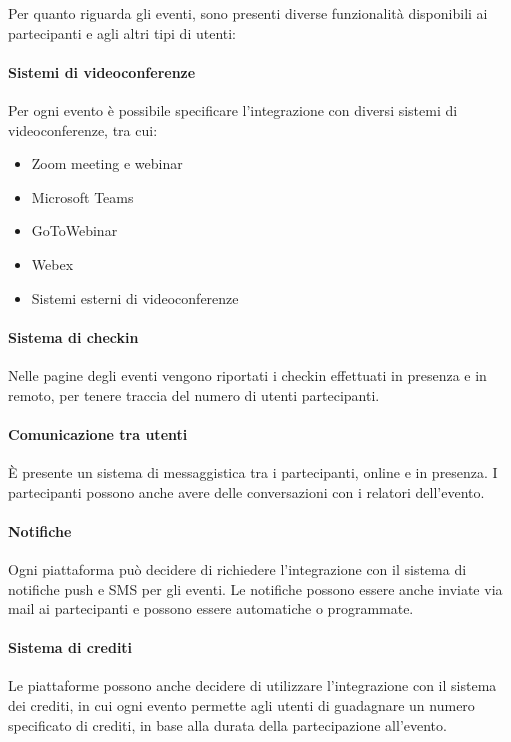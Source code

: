 \noindent Per quanto riguarda gli eventi, sono presenti diverse funzionalità disponibili ai partecipanti e agli altri tipi di utenti:
\paragraph{Sistemi di videoconferenze} Per ogni evento è possibile specificare l'integrazione con diversi sistemi di videoconferenze, tra cui:
\begin{itemize}
	\item Zoom meeting e webinar
	\item Microsoft Teams
	\item GoToWebinar
	\item Webex
	\item Sistemi esterni di videoconferenze
\end{itemize}
\paragraph{Sistema di checkin} Nelle pagine degli eventi vengono riportati i checkin effettuati in presenza e in remoto, per tenere traccia del numero di utenti partecipanti.
\paragraph{Comunicazione tra utenti} È presente un sistema di messaggistica tra i partecipanti, online e in presenza. I partecipanti possono anche avere delle conversazioni con i relatori dell'evento.
\paragraph{Notifiche} Ogni piattaforma può decidere di richiedere l'integrazione con il sistema di notifiche push e SMS per gli eventi. Le notifiche possono essere anche inviate via mail ai partecipanti e possono essere automatiche o programmate.
\paragraph{Sistema di crediti} Le piattaforme possono anche decidere di utilizzare l'integrazione con il sistema dei crediti, in cui ogni evento permette agli utenti di guadagnare un numero specificato di crediti, in base alla durata della partecipazione all'evento.

